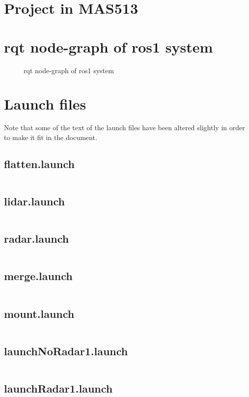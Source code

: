 \appendix

\chapter{Project in MAS513}
\label{Appdix:MAS513}
 

\chapter{rqt node-graph of ros1 system}
\label{Appdix:rqtROS1NB}
\newpage
\begin{figure}[H]

  \caption{rqt node-graph of ros1 system}
  \label{fig:Appdix:rqt:ros1_noBridge}
\end{figure}

\chapter{Launch files}
Note that some of the text of the launch files have been altered slightly in order to make it fit in the document.
\section{flatten.launch}
\label{Appdix:flatten.launch}
\inputminted{xml}{ros_system/launch/src/sublaunch/flatten.launch}

\section{lidar.launch}
\label{Appdix:lidar.launch}
\inputminted{xml}{ros_system/launch/src/sublaunch/lidar.launch}

\section{radar.launch}
\label{Appdix:radar.launch}
\inputminted{xml}{ros_system/launch/src/sublaunch/radar.launch}

\section{merge.launch}
\label{Appdix:merge.launch}
\inputminted{xml}{ros_system/launch/src/sublaunch/merge.launch}

\section{mount.launch}
\label{Appdix:mount.launch}
\inputminted{xml}{ros_system/launch/src/sublaunch/mount.launch}

\section{launchNoRadar1.launch}
\label{Appdix:launchNoRadar1.launch}
\inputminted{xml}{ros_system/launch/launchNoRadar1.launch}

\section{launchRadar1.launch}
\label{Appdix:launchRadar1.launch}
\inputminted{xml}{ros_system/launch/launchRadar1.launch}